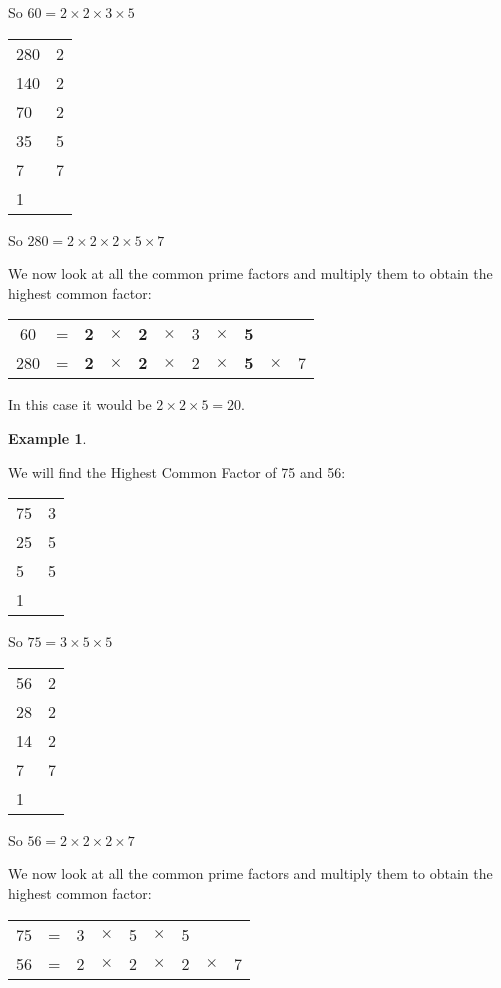 \documentclass[11pt, oneside]{article}
\theoremstyle{definition}
\newtheorem{exmp}{Example}[section]
\begin{document}
So $60 = 2 \times 2 \times 3 \times 5$

\bigbreak

\begin{tabular}{ p{0.5cm} | p{1.5cm}}
280 & 2  \\
140 & 2  \\
70 & 2  \\
35 & 5  \\
7 & 7 \\
1 
\end{tabular}

So $280 = 2 \times 2 \times 2 \times 5 \times 7$

We now look at all the common prime factors and multiply them to obtain the highest common factor:

\begin{tabular}{c c c c c c c c c c c}
60 & = & {\bf2} & $\times $ & {\bf2} & $\times$  & 3 & $\times$ & {\bf5} &  &  \\
280 & = & {\bf2} & $\times $ & {\bf2} & $\times$  & 2 & $\times$ & {\bf5} & $\times $ & 7
\end{tabular}

In this case it would be $2\times 2\times 5 = 20$.

\begin{exmp} \end{exmp}
We will find the Highest Common Factor of 75 and 56:

\begin{tabular}{ p{0.5cm} | p{1.5cm}}
75 & 3  \\
25 & 5  \\
5 & 5  \\
1 &  
\end{tabular}

So $75 = 3 \times 5 \times 5$

\bigbreak

\begin{tabular}{ p{0.5cm} | p{1.5cm}}
56 & 2  \\
28 & 2  \\
14 & 2  \\
7 & 7  \\
1 
\end{tabular}

So $56 = 2 \times 2 \times 2 \times 7$

We now look at all the common prime factors and multiply them to obtain the highest common factor:

\begin{tabular}{c c c c c c c c c}
75 & = & 3 & $\times $ & 5 & $\times$  & 5 & &  \\
56 & = & 2 & $\times $ & 2 & $\times$  & 2 & $\times$ & 7
\end{tabular}
\end{document}

